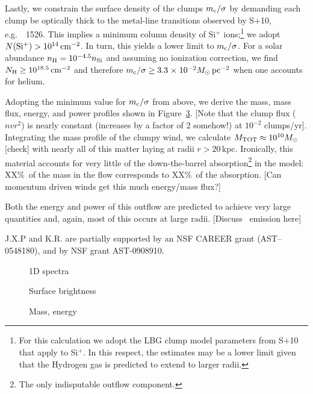 \documentclass[12pt,preprint]{aastex}
\begin{document}
Lastly, we constrain the surface density of the clumps $m_{\rm
  c}/\sigma$ by demanding each clump be optically thick to the
metal-line transitions observed by S+10, e.g.\ ~1526.  
This implies a minimum column density of Si$^+$ ions;\footnote{For this
  calculation we adopt the LBG clump model parameters from S+10 that
  apply to Si$^+$.  In this respect, the estimates may be a lower
  limit given that the Hydrogen gas is predicted to extend to larger
  radii.} 
we adopt
${N({\rm Si^+})} > 10^{14} \, {\rm cm^{-2}}$.  In turn, this yields a lower limit to
$m_{\rm c}/\sigma$.  For a solar abundance $n_{\rm H} = 10^{-4.5}
n_{\rm Si}$ and assuming no ionization correction, we find $N_{\rm H}
\ge 10^{18.5} \, {\rm cm^{-2}}$ and therefore $m_{\rm c} / \sigma \ge 3.3
{\; \times \; 10^{-2}} M_\odot \, \rm pc^{-2}$ when one accounts for helium.

Adopting the minimum value for $m_{\rm c}/\sigma$ from above,  we derive the mass,
mass flux, energy, and power profiles shown in
Figure~\ref{fig:mass_energy}.
[Note that the clump flux ($nvr^2$) is nearly constant (increases by a
factor of 2 somehow!) at $10^{-2}$ clumps/yr].
Integrating the mass profile of the clumpy wind, we calculate 
$M_{\rm TOT} \approx 10^{10} M_\odot$ [check] with nearly all of this
matter laying at radii $r>20$\,kpc.  Ironically, this material accounts for very little
of the down-the-barrel absorption\footnote{The only indisputable
  outflow component.} in the model: XX\%\ of the mass in the flow
corresponds to XX\%\ of the absorption.  
[Can momentum driven winds get this much energy/mass flux?]

Both the energy and power of this outflow are predicted to achieve
very large quantities and, again, most of this occurs at large radii.
[Discuss \lya\ emission here]

\acknowledgments

J.X.P and K.R. are partially supported
by an NSF CAREER grant (AST--0548180), and 
by NSF grant AST-0908910.

\clearpage

%
%



\clearpage

%

\begin{figure}
\caption{
1D spectra
}
\label{fig:1D}
\end{figure}

\begin{figure}
\caption{
Surface brightness
}
\label{fig:SB}
\end{figure}

\begin{figure}
\caption{
Mass, energy
}
\label{fig:mass_energy}
\end{figure}
\end{document}
